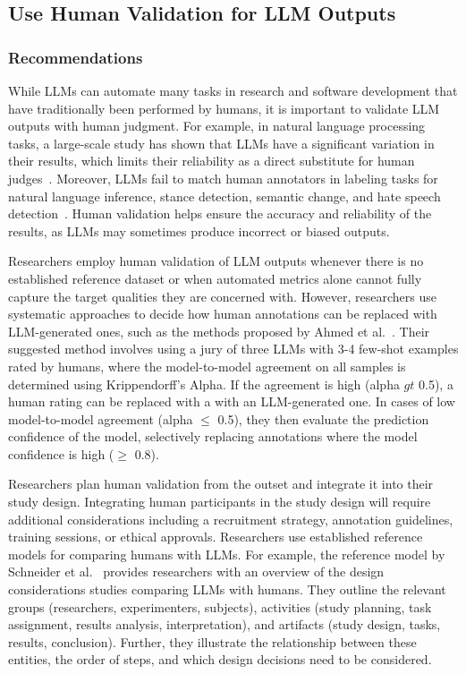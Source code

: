 



\subsection{Use Human Validation for LLM Outputs}

\subsubsection{Recommendations}

While LLMs can automate many tasks in research and software development that have traditionally been performed by humans, it is important to validate LLM outputs with human judgment.
For example, in natural language processing tasks, a large-scale study has shown that LLMs have a significant variation in their results, which limits their reliability as a direct substitute for human judges~\cite{DBLP:journals/corr/abs-2406-18403}. 
Moreover, LLMs fail to match human annotators in labeling tasks for natural language inference, stance detection, semantic change, and hate speech detection~\cite{DBLP:conf/chi/Wang0RMM24}.
Human validation helps ensure the accuracy and reliability of the results, as LLMs may sometimes produce incorrect or biased outputs.

Researchers \must employ human validation of LLM outputs whenever there is no established reference dataset or when automated metrics alone cannot fully capture the target qualities they are concerned with.
However, researchers \should use systematic approaches to decide how human annotations can be replaced with LLM-generated ones, such as the methods proposed by Ahmed et al.~\cite{DBLP:journals/corr/abs-2408-05534}.
Their suggested method involves using a jury of three LLMs with 3-4 few-shot examples rated by humans, where the model-to-model agreement on all samples is determined using Krippendorff's Alpha.
If the agreement is high (alpha $gt$ 0.5), a human rating can be replaced with a with an LLM-generated one.
In cases of low model-to-model agreement (alpha $\le$ 0.5), they then evaluate the prediction confidence of the model, selectively replacing annotations where the model confidence is high ($\ge$ 0.8).

Researchers \should plan human validation from the outset and integrate it into their study design.
Integrating human participants in the study design will require additional considerations including a recruitment strategy, annotation guidelines, training sessions, or ethical approvals.
Researchers \should use established reference models for comparing humans with LLMs.
For example, the reference model by Schneider et al.~\cite{Schneider2025ReferenceModel} provides researchers with an overview of the design considerations studies comparing LLMs with humans.
They outline the relevant groups (researchers, experimenters, subjects), activities (study planning, task assignment, results analysis, interpretation), and artifacts (study design, tasks, results, conclusion).
Further, they illustrate the relationship between these entities, the order of steps, and which design decisions need to be considered.

